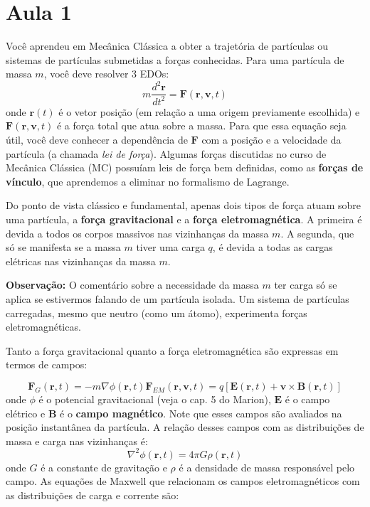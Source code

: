 \section*{Aula 1}

Você aprendeu em Mecânica Clássica a obter a trajetória de partículas ou
sistemas de partículas submetidas a forças conhecidas. Para uma partícula 
de massa $m$, você deve resolver 3 EDOs:
\begin{equation}
m \frac{d^2 {\bm r}}{dt^2} = {\bm F}({\bm r}, {\bm v}, t)
\end{equation}
onde ${\bm r}(t)$ é o vetor posição (em relação a uma origem 
previamente escolhida) e ${\bm F}({\bm r}, {\bm v}, t)$ é a força total que atua sobre a massa. Para que essa equação seja útil, você deve conhecer 
a dependência de ${\bm F}$ com a posição e a velocidade da partícula 
(a chamada {\it lei de força}). Algumas forças discutidas no curso de Mecânica Clássica (MC) possuíam leis de força bem definidas, como as 
{\bf forças de vínculo}, que aprendemos a eliminar no formalismo de Lagrange.

Do ponto de vista clássico e fundamental, apenas dois tipos de força atuam sobre
uma partícula, a \textbf{força gravitacional} e a \textbf{força eletromagnética}.
A primeira é devida a todos os corpos massivos nas vizinhanças da massa $m$. 
A segunda, que só se manifesta se a massa $m$ tiver uma carga $q$, é devida a
todas as cargas elétricas nas vizinhanças da massa $m$.

\begin{observacao}[]{}
    {\bf Observação:} O comentário sobre a necessidade da massa $m$ ter 
    carga só se aplica se estivermos falando de um partícula isolada. Um 
    sistema de partículas carregadas, mesmo que neutro (como um átomo), 
    experimenta forças eletromagnéticas.
\end{observacao}

Tanto a força gravitacional quanto a força eletromagnética são expressas em termos de campos:

\begin{subequations}
\begin{equation}
{\bm F}_{G}({\bm r}, t) = -m \nabla \phi({\bm r}, t)    
\end{equation}
\begin{equation}
{\bm F}_{EM}({\bm r}, {\bm v}, t) = q \left[ {\bm E}({\bm r}, t) + {\bm v} \times {\bm B}({\bm r}, t) \right]
\end{equation}
\end{subequations}
onde $\phi$ é o potencial gravitacional (veja o cap. 5 do Marion),
${\bm E}$ é o campo elétrico e ${\bm B}$ é o \textbf{campo magnético}.
Note que esses campos são avaliados na posição instantânea da partícula. A 
relação desses campos com as distribuições de massa e carga nas vizinhanças é:
\begin{equation}
    \nabla^2 \phi({\bm r}, t) = 4\pi G \rho({\bm r}, t)
\end{equation}
onde $G$ é a constante de gravitação e $\rho$ é a densidade de massa 
responsável pelo campo. As equações de Maxwell que relacionam os campos
eletromagnéticos com as distribuições de carga e corrente são:

